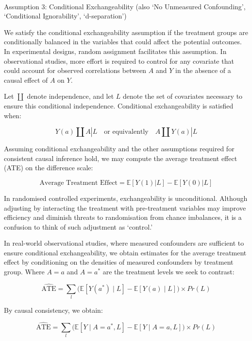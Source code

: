 \documentclass[
  single column]{article}
\makeatletter
\let\oldparagraph\paragraph
\renewcommand{\paragraph}{
    \@ifstar
      \xxxParagraphStar
      \xxxParagraphNoStar
  }
\newcommand{\xxxParagraphStar}[1]{\oldparagraph*{#1}\mbox{}}
\newcommand{\xxxParagraphNoStar}[1]{\oldparagraph{#1}\mbox{}}
\makeatother
\begin{document}
\paragraph{Assumption 3: Conditional Exchangeability (also `No
Unmeasured Confounding', `Conditional Ignorability',
`d-separation')}\label{assumption-3-conditional-exchangeability-also-no-unmeasured-confounding-conditional-ignorability-d-separation}

We satisfy the conditional exchangeability assumption if the treatment
groups are conditionally balanced in the variables that could affect the
potential outcomes. In experimental designs, random assignment
facilitates this assumption. In observational studies, more effort is
required to control for any covariate that could account for observed
correlations between \(A\) and \(Y\) in the absence of a causal effect
of \(A\) on \(Y\).

Let \(\coprod\) denote independence, and let \(L\) denote the set of
covariates necessary to ensure this conditional independence.
Conditional exchangeability is satisfied when:

\[
Y(a) \coprod A | L \quad \text{or equivalently} \quad A \coprod Y(a) | L
\]

Assuming conditional exchangeability and the other assumptions required
for consistent causal inference hold, we may compute the average
treatment effect (ATE) on the difference scale:

\[
\text{Average Treatment Effect} = \mathbb{E}[Y(1) | L] - \mathbb{E}[Y(0) | L]
\]

In randomised controlled experiments, exchangeability is unconditional.
Although adjusting by interacting the treatment with pre-treatment
variables may improve efficiency and diminish threats to randomisation
from chance imbalances, it is a confusion to think of such adjustment as
`control.'

In real-world observational studies, where measured confounders are
sufficient to ensure conditional exchangeability, we obtain estimates
for the average treatment effect by conditioning on the densities of
measured confounders by treatment group. Where \(A = a\) and \(A = a^*\)
are the treatment levels we seek to contrast:

\[
\widehat{\text{ATE}} =  \sum_l \big( \mathbb{E}[Y(a^*) \mid L] - \mathbb{E}[Y(a) \mid L] \big) \times Pr(L)
\]

By causal consistency, we obtain:

\[
\widehat{\text{ATE}} =  \sum_l \big( \mathbb{E}[Y \mid A = a^*, L] - \mathbb{E}[Y \mid A = a, L] \big) \times Pr(L)
\]
\end{document}
